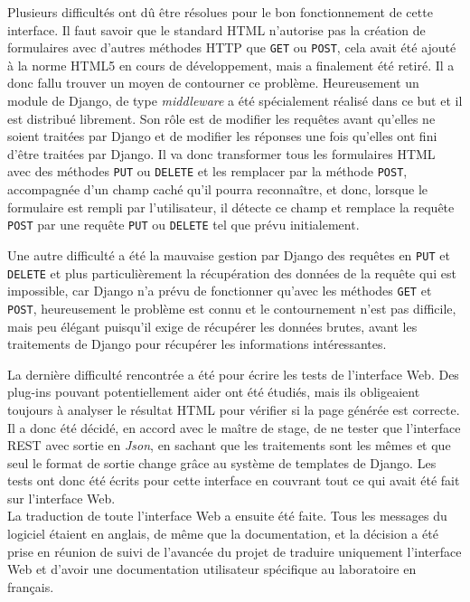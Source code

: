 \documentclass[12pt,a4paper,twoside]{report}
\begin{document}
Plusieurs difficultés ont dû être résolues pour le bon fonctionnement de cette
interface. Il faut savoir que le standard HTML n’autorise pas la création de
formulaires avec d’autres méthodes HTTP que \verb+GET+ ou \verb+POST+, cela
avait été ajouté à la norme HTML5 en cours de développement, mais a finalement
été retiré.  Il a donc fallu trouver un moyen de contourner ce problème.
Heureusement un module de Django, de type \emph{middleware} a été spécialement
réalisé dans ce but et il est distribué librement. Son rôle est de modifier les
requêtes avant qu’elles ne soient traitées par Django et de modifier les
réponses une fois qu’elles ont fini d’être traitées par Django. Il va donc
transformer tous les formulaires HTML avec des méthodes \verb+PUT+ ou
\verb+DELETE+ et les remplacer par la méthode \verb+POST+, accompagnée d’un
champ caché qu’il pourra reconnaître, et donc, lorsque le formulaire est rempli
par l’utilisateur, il détecte ce champ et remplace la requête \verb+POST+ par
une requête \verb+PUT+ ou \verb+DELETE+ tel que prévu initialement.

Une autre difficulté a été la mauvaise gestion par Django des requêtes en
\verb+PUT+ et \verb+DELETE+ et plus particulièrement la récupération des
données de la requête qui est impossible, car Django n’a prévu de
fonctionner qu’avec les méthodes \verb+GET+ et \verb+POST+, heureusement le
problème est connu et le contournement n’est pas difficile, mais peu élégant
puisqu’il exige de récupérer les données brutes, avant les traitements de
Django pour récupérer les informations intéressantes.

La dernière difficulté rencontrée a été pour écrire les tests de l’interface
Web. Des plug-ins pouvant potentiellement aider ont été étudiés, mais ils
obligeaient toujours à analyser le résultat HTML pour vérifier si la page
générée est correcte. Il a donc été décidé, en accord avec le maître de stage,
de ne tester que l’interface REST avec sortie en \emph{Json}, en sachant que
les traitements sont les mêmes et que seul le format de sortie change grâce au
système de templates de Django. Les tests ont donc été écrits pour cette
interface en couvrant tout ce qui avait été fait sur l’interface Web.\\

La traduction de toute l’interface Web a ensuite été faite. Tous les messages
du logiciel étaient en anglais, de même que la documentation, et la décision a
été prise en réunion de suivi de l’avancée du projet de traduire uniquement
l’interface Web et d’avoir une documentation utilisateur spécifique au
laboratoire en français.
\end{document}
